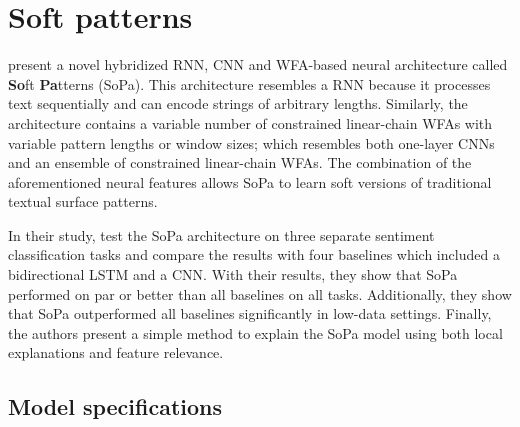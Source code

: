 \section{Soft patterns}

\label{section:soft-patterns}

\citet{schwartz2018sopa} present a novel hybridized RNN, CNN and WFA-based neural architecture called \textbf{So}ft \textbf{Pa}tterns (SoPa). This architecture resembles a RNN because it processes text sequentially and can encode strings of arbitrary lengths. Similarly, the architecture contains a variable number of constrained linear-chain WFAs with variable pattern lengths or window sizes; which resembles both one-layer CNNs and an ensemble of constrained linear-chain WFAs. The combination of the aforementioned neural features allows SoPa to learn soft versions of traditional textual surface patterns.

In their study, \citet{schwartz2018sopa} test the SoPa architecture on three separate sentiment classification tasks and compare the results with four baselines which included a bidirectional LSTM and a CNN. With their results, they show that SoPa performed on par or better than all baselines on all tasks. Additionally, they show that SoPa outperformed all baselines significantly in low-data settings. Finally, the authors present a simple method to explain the SoPa model using both local explanations and feature relevance.

\subsection{Model specifications}

